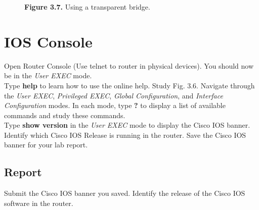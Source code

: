 \documentclass{../UTNetLab}
\begin{document}
    \begin{figure}[H]
        \centering
        \caption{\textbf{Figure 3.7.} Using a transparent bridge.}        
    \end{figure}

\section{IOS Console}
    Open Router Console (Use telnet to router in physical devices).
    You should now be in the \textit{User EXEC} mode. \\
    Type \textbf{help} to learn how to use the online help.
    Study Fig. 3.6. Navigate through the \textit{User EXEC}, \textit{Privileged EXEC}, \textit{Global Configuration}, and \textit{Interface Configuration} modes. In each mode, type \textbf{?} to display a list of available commands and study these commands. \\
    Type \textbf{show version} in the \textit{User EXEC} mode to display the Cisco IOS banner.
    Identify which Cisco IOS Release is running in the router.
    Save the Cisco IOS banner for your lab report.
    \subsection*{Report}
    Submit the Cisco IOS banner you saved.
    Identify the release of the Cisco IOS software in the router.
\end{document}
